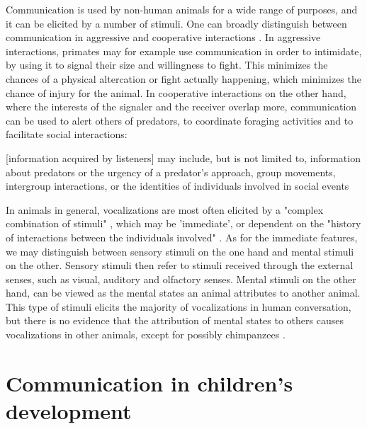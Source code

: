 Communication is used by non-human animals for a wide range of purposes, and it can be elicited by a number of stimuli.
One can broadly distinguish between communication in aggressive and cooperative interactions \citep{SeyfarthCheney03}. In aggressive interactions, primates may for example use communication in order to intimidate, by using it to signal their size and willingness to fight. This minimizes the chances of a physical altercation or fight actually happening, which minimizes the chance of injury for the animal.
In cooperative interactions on the other hand, where the interests of the signaler and the receiver overlap more, communication can be used to alert others of predators, to coordinate foraging activities and to facilitate social interactions:
\begin{quoting}
    {[information acquired by listeners]} may include, but is not limited to, information about predators or the urgency of a predator’s approach, group movements, intergroup interactions, or the identities of individuals involved in social events
    \hfill \citep[p.~168]{SeyfarthCheney03}
\end{quoting}

In animals in general, vocalizations are most often elicited by a "complex combination of stimuli" \citep[p.~150]{SeyfarthCheney03}, which may be 'immediate', or dependent on the "history of interactions between the individuals involved" \citep[p.~151]{SeyfarthCheney03}. As for the immediate features, we may distinguish between sensory stimuli on the one hand and mental stimuli on the other. Sensory stimuli then refer to stimuli received through the external senses, such as visual, auditory and olfactory senses. Mental stimuli on the other hand, can be viewed as the mental states an animal attributes to another animal. This type of stimuli elicits the majority of vocalizations in human conversation, but there is no evidence that the attribution of mental states to others causes vocalizations in other animals, except for possibly chimpanzees \citep{SeyfarthCheney03}.

\section{Communication in children's development}
\label{sec:comm:ontogeny}

